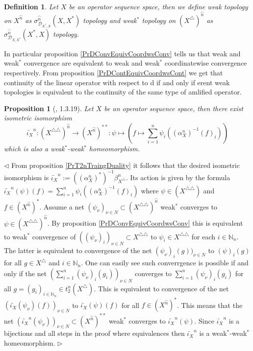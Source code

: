 \documentclass[12pt]{article}
\newtheorem{proposition}[theorem]{Proposition}
\newtheorem{definition}[theorem]{Definition}
\newenvironment{proof}{\par $\triangleleft$}{$\triangleright$}
\begin{document}
\begin{definition}\label{DefWeakConvForSQSp} Let $X$ be an operator sequence space, then we define weak topology on $X^{\wideparen{n}}$ as $\sigma_{\mathcal{D}_{X^*,X}}^{\wideparen{n}}(X,X^*)$ topology and weak${}^*$ topology on $(X^\triangle)^{\wideparen{n}}$ as $\sigma_{\mathcal{D}_{X,X^*}}^{\wideparen{n}}(X^*,X)$ topology.
\end{definition}

In particular proposition \ref{PrDConvEquivCoordwsConv} tells us that weak and weak${}^*$ convergence are equivalent to weak and weak${}^*$ coordinatewise convergence respectively. From proposition \ref{PrDContEquivCoordwsCont} we get that continuity of the linear operator with respect to d if and only if erent weak topologies is equivalent to the continuity of the same type of amlified operator.

\begin{proposition}[\cite{LamOpFolgen}, 1.3.19]\label{PrDoubleDualIsom} Let $X$ be an operator sequence space, then there exist isometric isomorphism
$$
\widetilde{\iota_X}^n:(X^{\triangle\triangle})^{\wideparen{n}}\to(X^{\wideparen{n}})^{**}:\psi\mapsto\left(f\mapsto\sum\limits_{i=1}^n \psi_i((\alpha_X^n)^{-1}(f)_i)\right)
$$
which is also a weak${}^*$-weak${}^*$ homeomorphism.
\end{proposition}
\begin{proof} From proposition \ref{PrT2nTraingDuality} it follows that the desired isometric isomorphism is $\widetilde{\iota_X}^n:=((\alpha_X^n)^*)^{-1}\beta_{X^\triangle}^n$. Its action is given by the formula $\widetilde{\iota_X}^n(\psi)(f)=\sum_{i=1}^n \psi_i((\alpha_X^n)^{-1}(f)_i)$ where $\psi\in (X^{\triangle\triangle})$ and $f\in (X^{\wideparen{n}})^*$. Assume a net $(\psi_\nu)_{\nu\in N}\subset (X^{\triangle\triangle})^{\wideparen{n}}$ weak${}^*$ converges to $\psi\in (X^{\triangle\triangle})^{\wideparen{n}}$. By proposition \ref{PrDConvEquivCoordwsConv} this is equivalent to weak${}^*$ convergence of $((\psi_\nu)_i)_{\nu\in N}\subset X^{\triangle\triangle}$ to $\psi_i\in X^{\triangle\triangle}$ for each $i\in\mathbb{N}_n$. The latter is equivalent to convergence of the net $(\psi_\nu)_i(g))_{\nu\in N}$ to $(\psi)_i(g)$ for all $g\in X^\triangle$ and $i\in\mathbb{N}_n$. One can easily see such converrgence is possible  if and only if  the net $(\sum_{i=1}^n(\psi_\nu)_i(g_i))_{\nu\in N}$ converges to $\sum_{i=1}^n(\psi_\nu)_i(g_i)$ for all $g=(g_i)_{i\in\mathbb{N}_n}\in t_2^n(X^\triangle)$. This is equivalent to convergence of the net $(\widetilde{\iota_X}(\psi_\nu)(f))_{\nu\in N}$ to $\widetilde{\iota_X}(\psi)(f)$ for all $f\in (X^{\wideparen{n}})^*$. This means that the net $(\widetilde{\iota_X}^n(\psi_\nu))_{\nu\in N}\subset (X^{\wideparen{n}})^{**}$ weak${}^*$ converges to $\widetilde{\iota_X}^n(\psi)$. Since $\widetilde{\iota_X}^n$ is a bijections and all steps in the proof where equivalences then $\widetilde{\iota_X}^n$ is a weak${}^*$-weak${}^*$ homeomorphism.
\end{proof}
\end{document}

